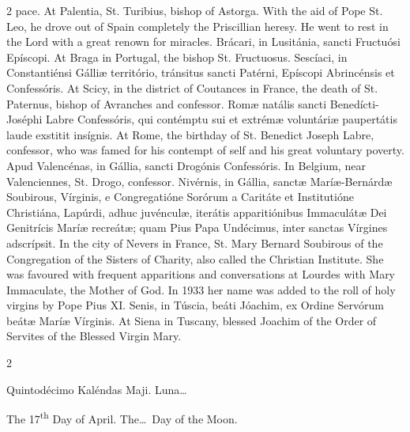 \begin{paracol}{2}
 pace.
\switchcolumn
{}
At Palentia, St. Turibius, bishop 
 of Astorga. With the aid of Pope St. Leo, he drove out of Spain 
 completely the Priscillian heresy. He went to rest in the Lord with a 
 great renown for miracles.
\switchcolumn*
{}
Brácari, in Lusitánia, 
 sancti Fructuósi Epíscopi.
\switchcolumn
{}
At Braga in Portugal, the bishop 
 St. Fructuosus.
\switchcolumn*
{}
Sescíaci, in 
 Constantiénsi Gálliæ território, tránsitus sancti Patérni, Epíscopi 
 Abrincénsis et Confessóris.
\switchcolumn
{}
At Scicy, in the district of 
 Coutances in France, the death of St. Paternus, bishop of Avranches and 
 confessor.
\switchcolumn*
{}
Romæ natális sancti 
 Benedícti-Joséphi Labre Confessóris, qui contémptu sui et extrémæ voluntáriæ 
 paupertátis laude exstitit insígnis.
\switchcolumn
{}
At Rome, the birthday of St. 
 Benedict Joseph Labre, confessor, who was famed for his contempt of self and 
 his great voluntary poverty.
\switchcolumn*
{}
Apud Valencénas, in 
 Gállia, sancti Drogónis Confessóris.
\switchcolumn
{}
In Belgium, near Valenciennes, St. 
 Drogo, confessor.
\switchcolumn*
{}
Nivérnis, in Gállia, 
 sanctæ Maríæ-Bernárdæ Soubirous, Vírginis, e Congregatióne Sorórum a 
 Caritáte et Institutióne Christiána, Lapúrdi, adhuc juvénculæ, iterátis 
 apparitiónibus Immaculátæ Dei Genitrícis Maríæ recreátæ; quam Pius Papa 
 Undécimus, inter sanctas Vírgines adscrípsit.
\switchcolumn
{}
In the city of Nevers in France, 
 St. Mary Bernard Soubirous of the Congregation of the Sisters of Charity, 
 also called the Christian Institute. She was favoured with frequent 
 apparitions and conversations at Lourdes with Mary Immaculate, the Mother of 
 God. In 1933 her name was added to the roll of holy virgins by Pope 
 Pius XI.
\switchcolumn*
{}
Senis, in Túscia, 
 beáti Jóachim, ex Ordine Servórum beátæ Maríæ Vírginis.
\switchcolumn
{}
At Siena in Tuscany, blessed 
 Joachim of the Order of Servites of the Blessed Virgin Mary.
\switchcolumn*
{}
\end{paracol}


\begin{paracol}{2}
\begin{center}{\color{gregoriocolor} Quintodécimo Kaléndas Maji. 
 Luna\dots\ }\end{center}
\switchcolumn
{}
\begin{center}{\color{gregoriocolor} The 17\textsuperscript{th} Day of April. The\dots\ Day of the Moon.}\end{center}
\end{paracol}

